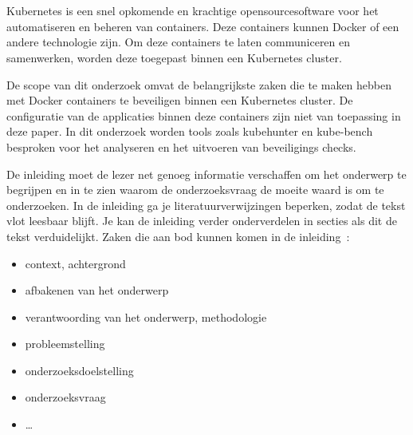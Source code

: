 
\chapter{}%
\label{ch:inleiding}

Kubernetes is een snel opkomende en krachtige opensourcesoftware voor het automatiseren en beheren van containers. Deze containers kunnen Docker of een andere technologie zijn. Om deze containers te laten communiceren en samenwerken, worden deze toegepast binnen een Kubernetes cluster. 

De scope van dit onderzoek omvat de belangrijkste zaken die te maken hebben met Docker containers te beveiligen binnen een Kubernetes cluster. De configuratie van de applicaties binnen deze containers zijn niet van toepassing in deze paper. In dit onderzoek worden tools zoals kubehunter en kube-bench besproken voor het analyseren en het uitvoeren van beveiligings checks. 

De inleiding moet de lezer net genoeg informatie verschaffen om het onderwerp te begrijpen en in te zien waarom de onderzoeksvraag de moeite waard is om te onderzoeken. In de inleiding ga je literatuurverwijzingen beperken, zodat de tekst vlot leesbaar blijft. Je kan de inleiding verder onderverdelen in secties als dit de tekst verduidelijkt. Zaken die aan bod kunnen komen in de inleiding~\autocite{Pollefliet2011}:

\begin{itemize}
  \item context, achtergrond
  \item afbakenen van het onderwerp
  \item verantwoording van het onderwerp, methodologie
  \item probleemstelling
  \item onderzoeksdoelstelling
  \item onderzoeksvraag
  \item \ldots
\end{itemize}

\section{}%
\label{sec:probleemstelling}

